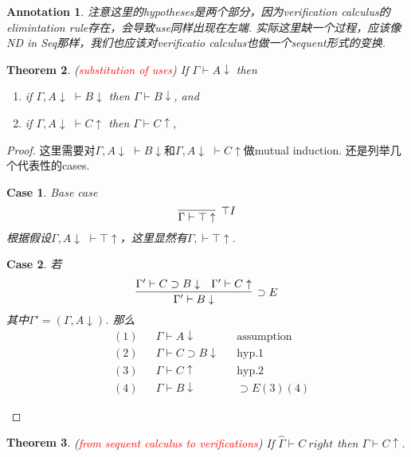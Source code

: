 \documentclass{article}
\theoremstyle{plain}
\newtheorem{theorem}{Theorem}
\newtheorem{annotation}[theorem]{Annotation}
\newcounter{case}
\newtheorem{case}{Case}
\theoremstyle{nonumberplain}
\newtheorem{proof}{Proof}
\newcommand{\redt}[1]{\textcolor{red}{#1}}
\begin{document}
\begin{annotation}
\rm 注意这里的hypotheses是两个部分，因为verification calculus的elimintation rule存在，会导致use同样出现在左端. 实际这里缺一个过程，应该像ND in Seq那样，我们也应该对verificatio calculus也做一个sequent形式的变换. 
\end{annotation}

\begin{theorem}\label{substitution of uses}
\rm (\redt{substitution of uses}) If $\Gamma \vdash A \downarrow$ then 
\begin{enumerate}
	\item if $\Gamma, A \downarrow \,\,\vdash B \downarrow$ then $\Gamma \vdash B \downarrow$, and
	\item if $\Gamma, A \downarrow \,\,\vdash C \uparrow$ then $\Gamma \vdash C \uparrow$,
\end{enumerate}
\end{theorem}

\begin{proof}
\rm 这里需要对$\Gamma, A \downarrow \,\,\vdash B \downarrow$和$\Gamma, A \downarrow \,\,\vdash C \uparrow$做mutual induction. 还是列举几个代表性的cases.
\begin{case}Base case
$$
\infer[\top I]{\Gamma \vdash \top \uparrow}{}
$$
根据假设$\Gamma, A \downarrow \,\,\vdash \top \uparrow$，这里显然有$\Gamma, \vdash \top \uparrow$.
\end{case}
\begin{case}若
$$
\infer[\supset E]{\Gamma' \vdash B\downarrow}{\Gamma' \vdash C \supset B \downarrow & \Gamma' \vdash C \uparrow}
$$
其中$\Gamma' = (\Gamma, A\downarrow)$. 那么
$$
\begin{aligned}
&(1) && \Gamma \vdash A \downarrow && \text{assumption} \\
&(2) && \Gamma \vdash C \supset B \downarrow && \text{hyp}.1 \\
&(3) && \Gamma \vdash C \uparrow && \text{hyp}.2 \\
&(4) && \Gamma \vdash B \downarrow && \supset E (3)(4)     
\end{aligned}
$$
\end{case}
\end{proof}

\begin{theorem}\label{seq-to-vu}
\rm (\redt{from sequent calculus to verifications}) If $\widehat{\Gamma} \vdash C~right$ then $\Gamma \vdash C \uparrow$. 
\end{theorem}
\end{document}

